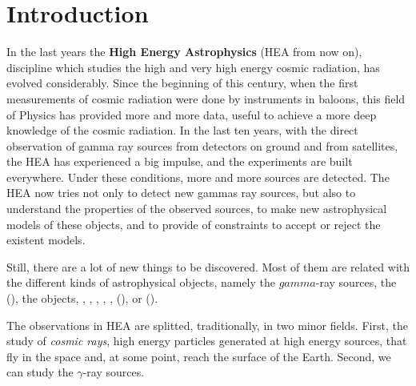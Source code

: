 %

\chapter*{Introduction}
\label{chapter:intro}
\renewcommand{\headname}{Introduction}
%

In the last years the {\bfseries High Energy Astrophysics} (HEA from
now on), discipline which studies the high and very high energy cosmic
radiation, has evolved considerably.  Since the beginning of this
century, when the first measurements of cosmic radiation were done by
instruments in baloons, this field of Physics has provided more and
more data, useful to achieve a more deep knowledge of the cosmic
radiation. In the last ten years, with the direct observation of gamma
ray sources from detectors on ground and from satellites, the HEA has
experienced a big impulse, and the experiments are built
everywhere. Under these conditions, more and more sources are
detected. The HEA now tries not only to detect new gammas ray sources,
but also to understand the properties of the observed sources, to make
new astrophysical models of these objects, and to provide of
constraints to accept or reject the existent models.

Still, there are a lot of new things to be discovered. Most of them
are related with the different kinds of astrophysical objects, namely
the $gamma$-ray sources, the
 (), the
 objects, , ,
, , ,  (), or  ().

The observations in HEA are splitted, traditionally, in two minor
fields. First, the study of {\itshape cosmic rays}, high energy
particles generated at high energy sources, that fly in the space and,
at some point, reach the surface of the Earth. Second, we can study
the $\gamma$-ray sources.

